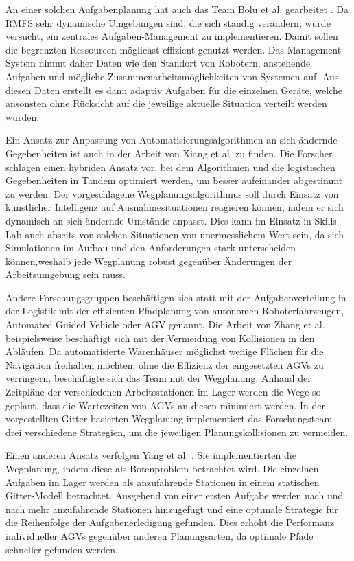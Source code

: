 An einer solchen Aufgabenplanung hat auch das Team Bolu et al. gearbeitet \cite{adaptivePlanning}. Da RMFS sehr dynamische Umgebungen sind, die sich ständig verändern, wurde versucht, ein zentrales Aufgaben-Management zu implementieren. Damit sollen die begrenzten Ressourcen möglichst effizient genutzt werden. Das Management-System nimmt daher Daten wie den Standort von Robotern, anstehende Aufgaben und mögliche Zusammenarbeitsmöglichkeiten von Systemen auf. Aus diesen Daten erstellt es dann adaptiv Aufgaben für die einzelnen Geräte, welche ansonsten ohne Rücksicht auf die jeweilige aktuelle Situation verteilt werden würden.

Ein Ansatz zur Anpassung von Automatisierungsalgorithmen an sich ändernde Gegebenheiten ist auch in der Arbeit von Xiang et al. \cite{BIMExtension} zu finden. Die Forscher schlagen einen hybriden Ansatz vor, bei dem Algorithmen und die logistischen Gegebenheiten in Tandem optimiert werden, um besser aufeinander abgestimmt zu werden. Der vorgeschlagene Wegplanungsalgorithmus soll durch Einsatz von künstlicher Intelligenz auf Ausnahmesituationen reagieren können, indem er sich dynamisch an sich ändernde Umstände anpasst. Dies kann im Einsatz in Skills Lab auch abseits von solchen Situationen von unermesslichem Wert sein, da sich Simulationen im Aufbau und den Anforderungen stark unterscheiden können,weshalb jede Wegplanung robust gegenüber Änderungen der Arbeitsumgebung sein muss.

Andere Forschungsgruppen beschäftigen sich statt mit der Aufgabenverteilung in der Logistik mit der effizienten Pfadplanung von autonomen Roboterfahrzeugen, Automated Guided Vehicle oder AGV genannt. Die Arbeit von Zhang et al. \cite{routeAGV} beispielsweise beschäftigt sich mit der Vermeidung von Kollisionen in den Abläufen. Da automatisierte Warenhäuser möglichst wenige Flächen für die Navigation freihalten möchten, ohne die Effizienz der eingesetzten AGVs zu verringern, beschäftigte sich das Team mit der Wegplanung. Anhand der Zeitpläne der verschiedenen Arbeitsstationen im Lager werden die Wege so geplant, dass die Wartezeiten von AGVs an diesen minimiert werden. In der vorgestellten Gitter-basierten Wegplanung implementiert das Forschungsteam drei verschiedene Strategien, um die jeweiligen Planungskollisionen zu vermeiden.

Einen anderen Ansatz verfolgen Yang et al. \cite{2DPlan}. Sie implementierten die Wegplanung, indem diese als Botenproblem betrachtet wird. Die einzelnen Aufgaben im Lager werden als anzufahrende Stationen in einem statischen Gitter-Modell betrachtet. Ausgehend von einer ersten Aufgabe werden nach und nach mehr anzufahrende Stationen hinzugefügt und eine optimale Strategie für die Reihenfolge der Aufgabenerledigung gefunden. Dies erhöht die Performanz individueller AGVs gegenüber anderen Planungsarten, da optimale Pfade schneller gefunden werden.

